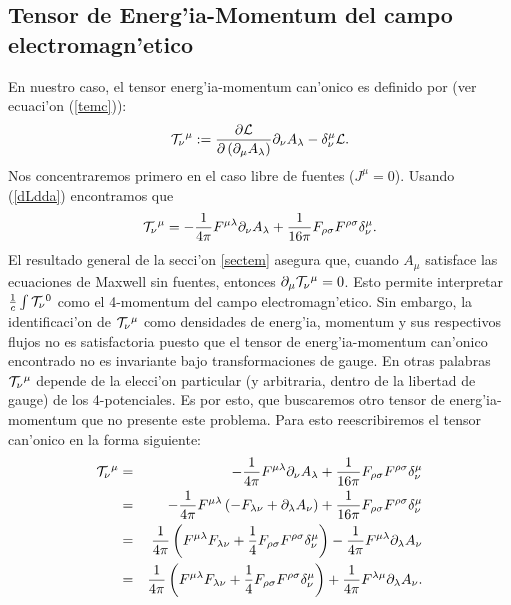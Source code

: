 \subsection{Tensor de Energ'ia-Momentum del campo electromagn'etico}
En nuestro caso, el tensor energ'ia-momentum can'onico es definido por (ver
ecuaci'on (\ref{temc})):
\begin{equation}
{\cal T}_\nu{}^\mu :=\frac{\partial{\cal L}}{\partial\left( \partial_\mu
A_{\lambda}\right) }\partial_{\nu}A_{\lambda}-\delta_{\nu}^\mu{\cal L} .
\end{equation}
Nos concentraremos primero en el caso libre de fuentes ($J^\mu=0$). Usando
(\ref{dLdda}) encontramos que
\begin{equation}
{\cal T}_\nu{}^\mu
=-\frac{1}{4\pi}F^{\mu\lambda}\partial_{\nu}A_{\lambda}+\frac{1}{16\pi}F_{
\rho\sigma}F^{\rho\sigma}\delta_{\nu}^\mu .
\end{equation}
El resultado general de la secci'on \ref{sectem} asegura que, cuando $A_\mu$
satisface las ecuaciones de Max\-well sin fuentes, entonces $\partial_\mu{\cal
T}_\nu{}^\mu=0$. Esto permite interpretar $\frac{1}{c}\int {\cal T}_\nu{}^0$ como el
4-momentum del campo electromagn'etico. Sin embargo, la identificaci'on de
${\cal T}_\nu{}^\mu$ como densidades de energ'ia, momentum y sus respectivos
flujos no es satisfactoria puesto que el tensor de energ'ia-momentum can'onico
encontrado no es invariante bajo transformaciones de gauge. En otras palabras
${\cal T}_\nu{}^\mu$ depende de la elecci'on particular (y arbitraria, dentro de
la libertad de gauge) de los 4-potenciales. Es por esto, que buscaremos otro
tensor de energ'ia-momentum que no presente este problema. Para esto
reescribiremos el tensor can'onico en la forma siguiente:
\begin{eqnarray}
{\cal T}_\nu{}^\mu
&=&-\frac{1}{4\pi}F^{\mu\lambda}\partial_{\nu}A_{\lambda}+\frac{1}{16\pi}F_{
\rho\sigma}F^{\rho\sigma}\delta_{\nu}^\mu \\
&=&-\frac{1}{4\pi}F^{\mu\lambda}\left(  -F_{\lambda\nu
}+\partial_{\lambda}A_{\nu}\right)  +\frac{1}{16\pi}F_{\rho\sigma}%
F^{\rho\sigma}\delta_{\nu}^\mu \\
&=&\frac{1}{4\pi}\left(  F^{\mu\lambda}F_{\lambda\nu}+\frac{1}{4}F_{\rho
\sigma}F^{\rho\sigma}\delta_{\nu}^\mu \right)  -\frac{1}{4\pi}F^{\mu\lambda
}\partial_{\lambda}A_{\nu}\\
&=&\frac{1}{4\pi}\left(  F^{\mu\lambda}F_{\lambda\nu}+\frac{1}{4}F_{\rho
\sigma}F^{\rho\sigma}\delta_{\nu}^\mu \right)  +\frac{1}{4\pi}F^{\lambda\mu
}\partial_{\lambda}A_{\nu}.
\end{eqnarray}

